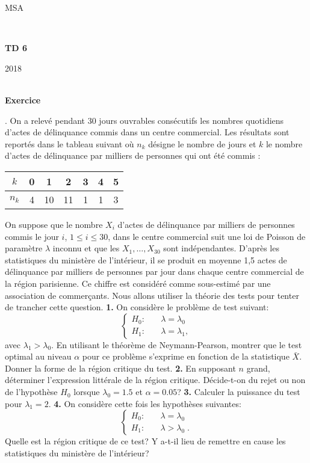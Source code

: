 \documentclass[11pt,a4paper]{article}
\newcounter{exo}
\def\exo{\mbox{}\\[0em]\hspace*{0em}\bf Exercice
\addtocounter{exo}{1}\arabic{exo}.\rm\hspace{1ex}}
\begin{document}
\centerline{\sc MSA}  \centerline{~}
\vskip1cm \centerline{{\bf TD 6}} \centerline{2018}

\exo
On a relevé pendant 30 jours ouvrables consécutifs les nombres quotidiens d'actes de délinquance commis dans un  centre commercial. Les résultats sont reportés dans le tableau suivant où $n_k$ désigne le nombre de jours et  $k$ le nombre d'actes de délinquance par milliers de personnes qui ont été commis :

\begin{center}
  \begin{tabular}{c | c c c c c c}
    $k$ & 0 & 1& 2& 3& 4& 5\\
    \hline
    $n_k$ & 4&10&11&1&1&3
  \end{tabular}
\end{center}

On suppose que le nombre $X_i$ d'actes de délinquance par milliers de personnes commis le jour $i$, $1 \leqslant i \leqslant 30$, dans  le  centre commercial  suit  une  loi  de Poisson  de  paramètre $\lambda$   inconnu et que les $X_1,\ldots,X_{30}$ sont indépendantes.  D'après   les  statistiques   du   ministère  de
l'intérieur, il  se produit  en moyenne 1,5  actes de  délinquance par milliers de personnes par
jour dans chaque centre commercial de la région parisienne. Ce chiffre
est   considéré    comme   sous-estimé   par    une   association   de
commer\c{c}ants. Nous allons  utiliser la théorie des tests  pour tenter de
trancher cette question.
\vskip 0.2cm
{\bf 1.} On considère le problème de test suivant:
 $$  \left \{ \begin{array}{ll}
    H_0: & \quad \lambda = \lambda_0\\
    H_1: & \quad \lambda = \lambda_1, 
     \end{array}  
 \right.
 $$
  avec $\lambda_1>\lambda_0$. En utilisant le théorème de
  Neymann-Pearson, montrer que le test optimal au niveau $\alpha$
  pour ce problème s'exprime en fonction de la statistique
  $\bar{X}$. Donner la forme de la région critique du test.
\vskip 0.2cm
{\bf 2.} En supposant $n$ grand, déterminer l'expression littérale de la
  région critique.  Décide-t-on du rejet ou non de l'hypothèse $H_0$   lorsque  $\lambda_0=1.5$
  et $\alpha =0.05$?
\vskip 0.2cm
{\bf 3.} Calculer la puissance du test pour $\lambda_1=2$.
\vskip 0.2cm
{\bf 4.}  On considère cette fois les hypothèses suivantes:
$$  \left \{ \begin{array}{ll}
    H_0: & \quad \lambda = \lambda_0\\
    H_1: & \quad \lambda > \lambda_0 \;.
    \end{array}  
 \right.
 $$
Quelle est la région critique de ce test? Y a-t-il lieu de remettre en
cause les statistiques du ministère de l'intérieur?
\end{document}
